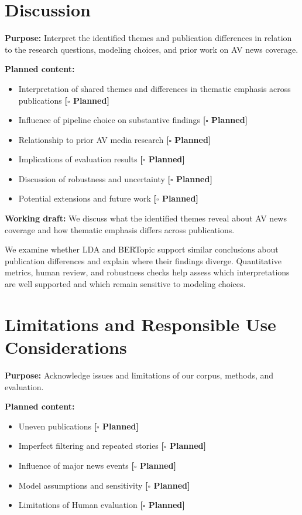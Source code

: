 \documentclass[conference]{IEEEtran}
\newcommand{\planned}{\textcolor{blue!60!black}{\textbf{[$\square$ Planned]}}}
\begin{document}
\section*{Discussion}
\textbf{Purpose:} Interpret the identified themes and publication differences in relation to the research questions, modeling choices, and prior work on AV news coverage.

\textbf{Planned content:} 
\begin{itemize}
    \item Interpretation of shared themes and differences in thematic emphasis across publications \planned
    \item Influence of pipeline choice on substantive findings \planned
    \item Relationship to prior AV media research \planned
    \item Implications of evaluation results \planned
    \item Discussion of robustness and uncertainty \planned 
    \item Potential extensions and future work \planned
\end{itemize}

\textbf{Working draft:}
We discuss what the identified themes reveal about AV news coverage and how thematic emphasis differs across publications. 

We examine whether LDA and BERTopic support similar conclusions about publication differences and explain where their findings diverge. Quantitative metrics, human review, and robustness checks help assess which interpretations are well supported and which remain sensitive to modeling choices.

\section*{Limitations and Responsible Use Considerations}
\textbf{Purpose:} Acknowledge issues and limitations of our corpus, methods, and evaluation.

\textbf{Planned content:} 
\begin{itemize}
    \item Uneven publications \planned
    \item Imperfect filtering and repeated stories \planned
    \item Influence of major news events \planned
    \item Model assumptions and sensitivity \planned
    \item Limitations of Human evaluation \planned
\end{itemize}
\end{document}
